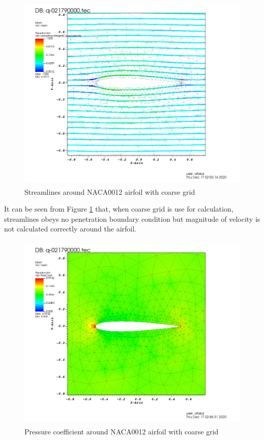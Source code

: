 \documentclass[letterpaper,12pt]{article}
\begin{document}
\begin{figure} [!h]
	\centering
	\includegraphics[height = 9.5cm]{graph/coarse/coarse_streamline0000.png}
	\caption{Streamlines around NACA0012 airfoil with coarse grid}
    \label{fig:airfoilcoarsestreamline}
\end{figure}

\newpage

It can be seen from Figure \ref{fig:airfoilcoarsestreamline} that, when coarse grid is 
use for calculation, streamlines obeys no penetration boundary condition but magnitude 
of velocity is not calculated correctly around the airfoil.

\vspace{2cm}

\begin{figure} [!h]
	\centering
	\includegraphics[height = 9.5cm]{graph/coarse/coarse_pressure0000.png}
	\caption{Pressure coefficient around NACA0012 airfoil with coarse grid}
    \label{fig:airfoilcoarsepressure}
\end{figure}
\end{document}
